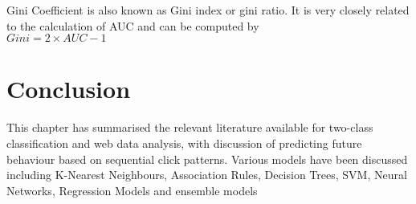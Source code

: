 Gini Coefficient is also known as Gini index or gini ratio. It is very closely related to the calculation of AUC and can be computed by\\
$Gini = 2 \times AUC - 1$


\section{Conclusion}\label{sotaConc}
This chapter has summarised the relevant literature available for two-class classification and web data analysis, with discussion of predicting future behaviour based on sequential click patterns. Various models have been discussed including K-Nearest Neighbours, Association Rules, Decision Trees, SVM, Neural Networks, Regression Models and ensemble models


